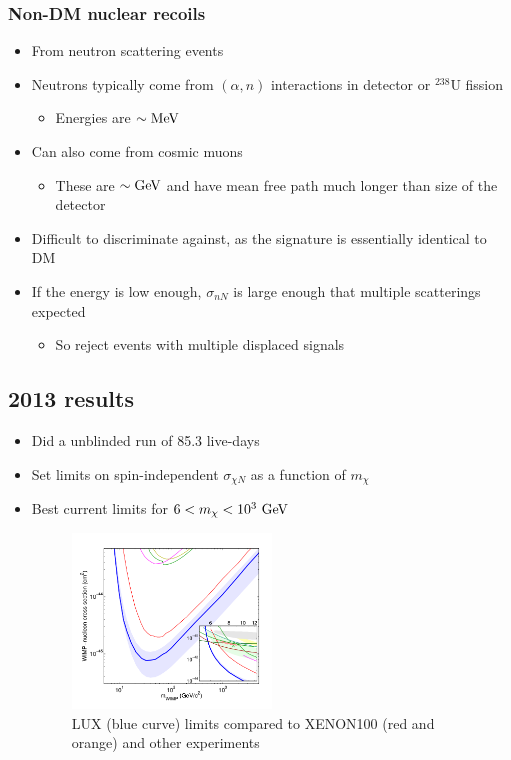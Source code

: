 \subsubsection{Non-DM nuclear recoils}
\begin{itemize}
  \item From neutron scattering events
  \item Neutrons typically come from $(\alpha,n)$ interactions in detector or $^{238}$U fission
  \begin{itemize}
     \item Energies are $\sim\text{MeV}$
   \end{itemize} 
  \item Can also come from cosmic muons
  \begin{itemize}
    \item These are $\sim\text{GeV}$ and have mean free path much longer than size of the detector
  \end{itemize}
  \item Difficult to discriminate against, as the signature is essentially identical to DM
  \item If the energy is low enough, $\sigma_{nN}$ is large enough that multiple scatterings expected
  \begin{itemize}
    \item So reject events with multiple displaced signals
  \end{itemize}
\end{itemize}

\subsection{2013 results}
\begin{itemize}
  \item Did a unblinded run of 85.3 live-days
  \item Set limits on spin-independent $\sigma_{\chi N}$ as a function of $m_\chi$
  \item Best current limits for $6 < m_\chi < 10^3~\text{GeV}$
  \begin{figure}[H]
    \begin{center}
    \includegraphics[width=0.5\textwidth]{figs/lux_results.png}\\
    {LUX (blue curve) limits compared to XENON100 (red and orange) and other experiments}
    \end{center}
  \end{figure}
\end{itemize}

